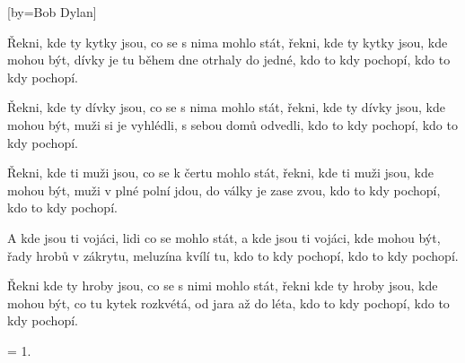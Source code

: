 [by={Bob Dylan}]

\beginverse{}
Řekni, kde ty kytky jsou, co se s nima mohlo stát,
řekni, kde ty kytky jsou, kde mohou být,
dívky je tu během dne otrhaly do jedné,
kdo to kdy pochopí, kdo to kdy pochopí.
\endverse{}

\beginverse{}
Řekni, kde ty dívky jsou, co se s nima mohlo stát,
řekni, kde ty dívky jsou, kde mohou být,
muži si je vyhlédli, s sebou domů odvedli,
kdo to kdy pochopí, kdo to kdy pochopí.
\endverse{}

\beginverse{}
Řekni, kde ti muži jsou, co se k čertu mohlo stát,
řekni, kde ti muži jsou, kde mohou být,
muži v plné polní jdou, do války je zase zvou,
kdo to kdy pochopí, kdo to kdy pochopí.
\endverse{}

\beginverse{}
A kde jsou ti vojáci, lidi co se mohlo stát,
a kde jsou ti vojáci, kde mohou být,
řady hrobů v zákrytu, meluzína kvílí tu,
kdo to kdy pochopí, kdo to kdy pochopí.
\endverse{}

\beginverse{}
Řekni kde ty hroby jsou, co se s nimi mohlo stát,
řekni kde ty hroby jsou, kde mohou být,
co tu kytek rozkvétá, od jara až do léta,
kdo to kdy pochopí, kdo to kdy pochopí.
\endverse{}

\beginverse{}
= 1.
\endverse{}

\endsong{}
